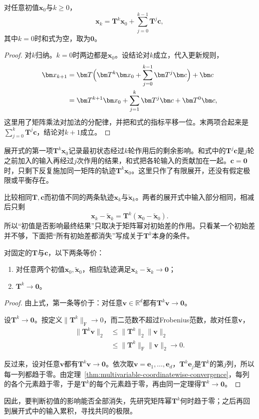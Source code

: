 \begin{lemma}[递推的有限展开]
\label{lem:ls-affine-unrolling}
对任意初值$\bm x_0$与$k\geq0$，
\begin{equation}
 \bm x_k=\bm T^k\bm x_0+\sum_{j=0}^{k-1}\bm T^j\bm c ,
 \label{eq:ls-affine-unrolling}
\end{equation}
其中$k=0$时和式为空，取为$\bm0$。
\end{lemma}
\begin{proof}
对$k$归纳。$k=0$时两边都是$\bm x_0$。设结论对$k$成立，代入更新规则，
\[
\begin{aligned}
 \bm x_{k+1}&=\bm T\Bigl(\bm T^k\bm x_0+\sum_{j=0}^{k-1}\bm T^j\bm c\Bigr)+\bm c\\
 &=\bm T^{k+1}\bm x_0+\sum_{j=1}^{k}\bm T^j\bm c+\bm T^0\bm c ,
\end{aligned}
\]
这里用了矩阵乘法对加法的分配律，并把和式的指标平移一位。末两项合起来是$\sum_{j=0}^{k}\bm T^j\bm c$，结论对$k+1$成立。
\end{proof}
展开式的第一项$\bm T^k\bm x_0$记录最初状态经过$k$轮作用后的剩余影响。和式中的$\bm T^j\bm c$是$j$轮之前加入的输入再经过$j$次作用的结果，和式把各轮输入的贡献加在一起。$\bm c=\bm0$时，只剩下反复施加同一矩阵的轨迹$\bm T^k\bm x_0$。这里只作了有限展开，还没有假定极限或平衡存在。

比较相同$\bm T,\bm c$而初值不同的两条轨迹$\bm x_k$与$\widetilde{\bm x}_k$。两者的展开式中输入部分相同，相减后只剩
\[
 \bm x_k-\widetilde{\bm x}_k=\bm T^k(\bm x_0-\widetilde{\bm x}_0).
\]
所以“初值是否影响最终结果”只取决于矩阵幂对初始差的作用。只看某一个初始差并不够，下面把“所有初始差都消失”写成关于$\bm T^k$本身的条件。

\begin{lemma}[初值差异消失的条件]
\label{lem:ls-affine-difference-decay}
对固定的$\bm T$与$\bm c$，以下两条等价：
\begin{enumerate}
 \item 对任意两个初值$\bm x_0,\widetilde{\bm x}_0$，相应轨迹满足$\bm x_k-\widetilde{\bm x}_k\to\bm0$；
 \item $\bm T^k\to\bm0$。
\end{enumerate}
\end{lemma}
\begin{proof}
由上式，第一条等价于：对任意$\bm v\in\mathbb R^d$都有$\bm T^k\bm v\to\bm0$。

设$\bm T^k\to\bm0$。按定义$\lVert\bm T^k\rVert_{\mathrm F}\to0$，而二范数不超过Frobenius范数，故对任意$\bm v$，
\[
\begin{aligned}
 \lVert\bm T^k\bm v\rVert_2&\leq\lVert\bm T^k\rVert_2\lVert\bm v\rVert_2\\
 &\leq\lVert\bm T^k\rVert_{\mathrm F}\lVert\bm v\rVert_2\to0 .
\end{aligned}
\]

反过来，设对任意$\bm v$都有$\bm T^k\bm v\to\bm0$。依次取$\bm v=\bm e_1,\ldots,\bm e_d$，$\bm T^k\bm e_j$是$\bm T^k$的第$j$列，所以每一列都趋于零。由定理~\ref{thm:multivariable-coordinatewise-convergence}，每列的各个元素趋于零，于是$\bm T^k$的每个元素趋于零，再由同一定理得$\bm T^k\to\bm0$。
\end{proof}
因此，要判断初值的影响能否全部消失，先研究矩阵幂$\bm T^k$何时趋于零；之后再回到展开式中的输入累积，寻找共同的极限。


